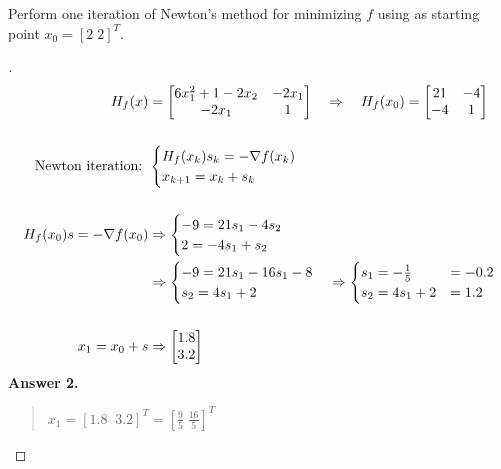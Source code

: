 \documentclass[12pt]{article}
\newenvironment{exercise}[2][Exercise]{\begin{trivlist}
\item[\hskip \labelsep {\bfseries #1}\hskip \labelsep {\bfseries #2.}]}{\end{trivlist}}
\begin{document}
\pagebreak
\begin{exercise}{2}
	Perform one iteration of Newton's method for minimizing $f$ using as starting point $x_0 = [2 \; 2]^T$.
\end{exercise} \vspace{-10mm}
\begin{proof}[]
	\begin{align*}
		H_f(x) &= \begin{bmatrix} 6x_1^2 + 1 - 2x_2 & -2x_1 \\ -2x_1 & 1 \end{bmatrix} \quad \Rightarrow \quad
		H_f(x_0) = \begin{bmatrix} 21 & -4 \\ -4 & 1 \end{bmatrix} \\[15pt]
		\textnormal{Newton iteration: } &\begin{cases} H_f(x_k) s_k = - \nabla f(x_k) \\ x_{k+1} = x_k + s_k \end{cases} \\[15pt]
		H_f(x_0) s = - \nabla f(x_0) &\Rightarrow \begin{cases} -9 = 21s_1 - 4s_2 \\ 2 = -4s_1 + s_2 \end{cases} \\
		&\Rightarrow \begin{cases} -9 = 21s_1 - 16s_1 - 8 \\ s_2 = 4s_1 + 2 \end{cases}
			\Rightarrow \begin{cases} s_1 = -\frac{1}{5} &= -0.2 \\ s_2 = 4s_1 + 2 &= 1.2 \end{cases} \\[15pt]
		x_{1} = x_0 + s &\Rightarrow \begin{bmatrix} 1.8 \\ 3.2 \end{bmatrix}
	\end{align*}
	\textbf{Answer 2.} \vspace{-7mm} \\
	\begin{quote}
		$x_1 = [1.8 \; \; 3.2]^T = [\frac{9}{5} \; \frac{16}{5}]^T$
	\end{quote}
\end{proof}
\end{document}
